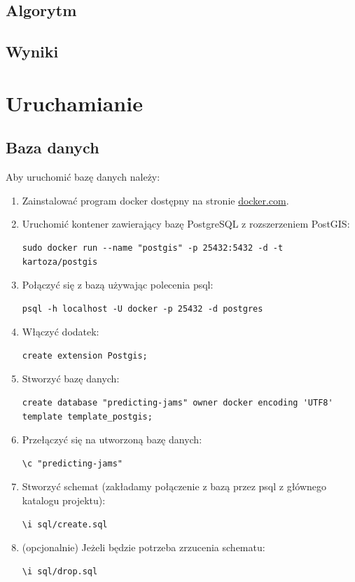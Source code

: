 \documentclass[a4paper,12pt]{mwart}
\begin{document}
\subsection{Algorytm}

\subsection{Wyniki}

\section{Uruchamianie}
\subsection{Baza danych}
Aby uruchomić bazę danych należy:
\begin{enumerate}
\item Zainstalować program docker dostępny na stronie \href{https://www.docker.com/}{docker.com}.
\item Uruchomić kontener zawierający bazę PostgreSQL z rozszerzeniem PostGIS:
\begin{lstlisting}
sudo docker run --name "postgis" -p 25432:5432 -d -t kartoza/postgis
\end{lstlisting}
\item Połączyć się z bazą używając polecenia psql:
\begin{lstlisting}
psql -h localhost -U docker -p 25432 -d postgres
\end{lstlisting}
\item Włączyć dodatek:
\begin{lstlisting}
create extension Postgis;
\end{lstlisting}
\item Stworzyć bazę danych:
\begin{lstlisting}
create database "predicting-jams" owner docker encoding 'UTF8' template template_postgis;
\end{lstlisting}
\item Przełączyć się na utworzoną bazę danych:
\begin{lstlisting}
\c "predicting-jams"
\end{lstlisting}
\item Stworzyć schemat (zakładamy połączenie z bazą przez psql z głównego katalogu projektu):
\begin{lstlisting}
\i sql/create.sql
\end{lstlisting}
\item (opcjonalnie) Jeżeli będzie potrzeba zrzucenia schematu:
\begin{lstlisting}
\i sql/drop.sql
\end{lstlisting}
\end{enumerate}
\end{document}
